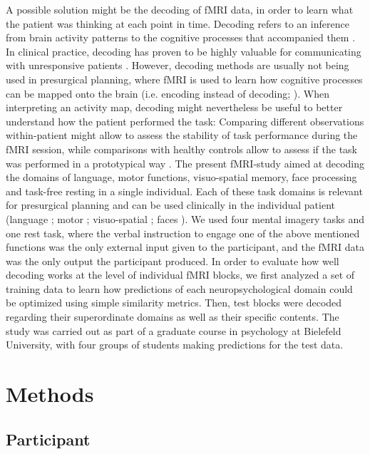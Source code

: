 \documentclass[fleqn,10pt]{SelfArx} %
\begin{document}
A possible solution might be the decoding of fMRI data, in order to learn what the patient was thinking at each point in time. Decoding refers to an inference from brain activity patterns to the cognitive processes that accompanied them \citep{Poldrack_2006,  Haynes_2006}. In clinical practice, decoding has proven to be highly valuable for communicating with unresponsive patients \citep{Owen_2006, Boly_2007, Sorger_2012}. However, decoding methods are usually not being used in presurgical planning, where fMRI is used to learn how cognitive processes can be mapped onto the brain (i.e. encoding instead of decoding; \citet{Naselaris_2011}). When interpreting an activity map, decoding might nevertheless be useful to better understand how the patient performed the task: Comparing different observations within-patient might allow to assess the stability of task performance during the fMRI session, while comparisons with healthy controls allow to assess if the task was performed in a prototypical way \citep{Dubois_2016}. The present fMRI-study aimed at decoding the domains of language, motor functions, visuo-spatial memory, face processing and task-free resting in a single individual. Each of these task domains is relevant for presurgical planning and can be used clinically in the individual patient (language \citet{Woermann_2003}; motor \citet{H_berg_2004}; visuo-spatial \citet{Jokeit_2001}; faces \citet{Parvizi_2012}). We used four mental imagery tasks and one rest task, where the verbal instruction to engage one of the above mentioned functions was the only external input given to the participant, and the fMRI data was the only output the participant produced. 
In order to evaluate how well decoding works at the level of individual fMRI blocks, we first analyzed a set of training data to learn how predictions of each neuropsychological domain could be optimized using simple similarity metrics. Then, test blocks were decoded regarding their superordinate domains as well as their specific contents. The study was carried out as part of a graduate course in psychology at Bielefeld University, with four groups of students making predictions for the test data.

\section{Methods}

\subsection{Participant}
\end{document}
